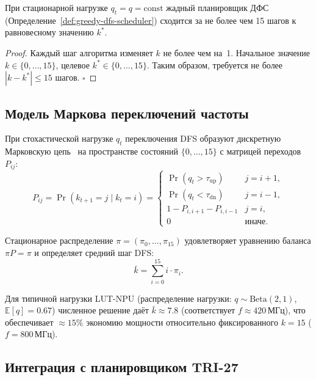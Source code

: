 \begin{proposition}
\label{prop:scheduler-convergence}
При стационарной нагрузке $q_t = q = \mathrm{const}$ жадный планировщик
ДФС (Определение~\ref{def:greedy-dfs-scheduler}) сходится за не более чем
15 шагов к равновесному значению $k^*$.
\end{proposition}

\begin{proof}
Каждый шаг алгоритма изменяет $k$ не более чем на~1. Начальное значение
$k \in \{0,\ldots,15\}$, целевое $k^* \in \{0,\ldots,15\}$.
Таким образом, требуется не более $|k - k^*| \leq 15$ шагов.
\hfill\ensuremath{\square}
\end{proof}

\subsection{Модель Маркова переключений частоты}
\label{subsec:markov-model}

При стохастической нагрузке $q_t$ переключения DFS образуют
дискретную Марковскую цепь~\cite{Hennessy-Patterson-CA6} на пространстве
состояний $\{0,\ldots,15\}$ с матрицей переходов $P_{ij}$:
\begin{equation}
  P_{ij} = \Pr(k_{t+1} = j \mid k_t = i)
  = \begin{cases}
    \Pr(q_t > \tau_{\mathrm{up}}) & j = i+1, \\
    \Pr(q_t < \tau_{\mathrm{dn}}) & j = i-1, \\
    1 - P_{i,i+1} - P_{i,i-1}    & j = i, \\
    0 & \text{иначе.}
  \end{cases}
  \label{eq:markov-transitions}
\end{equation}

Стационарное распределение $\pi = (\pi_0, \ldots, \pi_{15})$
удовлетворяет уравнению баланса $\pi P = \pi$ и определяет
средний шаг DFS:
\[
  \bar{k} = \sum_{i=0}^{15} i \cdot \pi_i.
\]

Для типичной нагрузки LUT-NPU (распределение нагрузки:
$q \sim \mathrm{Beta}(2, 1)$, $\mathbb{E}[q] = 0{.}67$)
численное решение даёт $\bar{k} \approx 7{.}8$ (соответствует
$f \approx 420\,\text{МГц}$), что обеспечивает $\approx 15\%$ экономию
мощности относительно фиксированного $k=15$ ($f=800\,\text{МГц}$).

\subsection{Интеграция с планировщиком TRI-27}
\label{subsec:tri27-integration}

